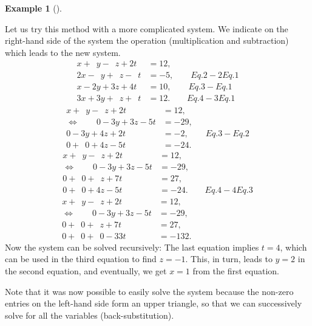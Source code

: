 \documentclass[
  a4paper,
  DIV=11,
  numbers=noendperiod,
  oneside]{scrreprt}
\theoremstyle{definition}
\newtheorem{example}{Example}[chapter]
\theoremstyle{remark}
\begin{document}
\begin{example}[]\protect\hypertarget{exm-ge1}{}\label{exm-ge1}

Let us try this method with a more complicated system. We indicate on
the right-hand side of the system the operation (multiplication and
subtraction) which leads to the new system. \[\begin{aligned}
 x+\phantom{2}y-\phantom{2}z+2t &= 12,\\
 2x-\phantom{2}y+\phantom{2}z-\phantom{2}t &=-5,    \qquad Eq. 2- 2 Eq. 1\\
 x-2y+3z+4t &= 10, \qquad Eq. 3-  Eq. 1\\ 
 3x+3y+\phantom{2}z+\phantom{2}t &= 12. \qquad Eq. 4- 3 Eq. 1
\end{aligned}\] \[\begin{aligned}
 x+\phantom{2}y-\phantom{2}z+2t &= 12,\\
\Leftrightarrow \qquad  0 - 3 y +3 z- 5 t &=-29,    \qquad  \\
 0-3y+4z+2t &= -2, \qquad Eq. 3-  Eq. 2\\ 
 0+\phantom{2}0 +4 z -5 t &= -24. 
\end{aligned}\] \[\begin{aligned}
 x+\phantom{2}y-\phantom{2}z+2t &= 12,\\
\Leftrightarrow \qquad  0 - 3 y +3 z- 5 t &=-29,    \qquad  \\
 0 + \phantom{2}0 + \phantom{1} z+7t &= 27,\\ 
 0+\phantom{2}0 +4 z -5 t &= -24.  \qquad  Eq.4- 4 Eq. 3
\end{aligned}\] \[\begin{aligned}
 x+\phantom{2}y-\phantom{2}z+2t &= 12,\\
\Leftrightarrow \qquad   0 - 3 y +3 z- 5 t &=-29,    \qquad  \phantom{Eq.4- 4 Eq. 3} \\
 0 + \phantom{2}0 + \phantom{1} z+7t &= 27,\\ 
 0+\phantom{2}0 + \phantom{2}0  -33 t &= -132.  
\end{aligned}\] Now the system can be solved recursively: The last
equation implies \(t=4\), which can be used in the third equation to
find \(z=-1\). This, in turn, leads to \(y=2\) in the second equation,
and eventually, we get \(x=1\) from the first equation.

\end{example}

Note that it was now possible to easily solve the system because the
non-zero entries on the left-hand side form an upper triangle, so that
we can successively solve for all the variables (back-substitution).
\end{document}
